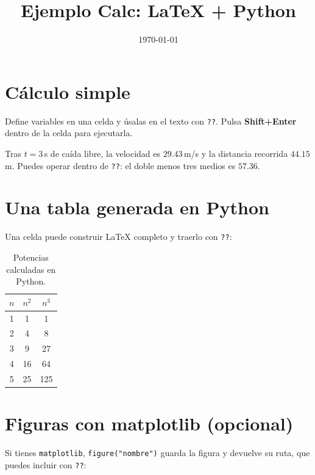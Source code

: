 \documentclass[12pt]{article}
\title{Ejemplo Calc: LaTeX + Python}
\author{}
\date{\today}
\begin{document}
\maketitle

\section{Cálculo simple}
Define variables en una celda y úsalas en el texto con \verb|??|.
Pulsa \textbf{Shift+Enter} dentro de la celda para ejecutarla.


Tras $t = 3\,$s de caída libre, la velocidad es $29.43\,$m/s y la
distancia recorrida $44.15\,$m. Puedes operar dentro de \verb|??|:
el doble menos tres medios es $57.36$.

\section{Una tabla generada en Python}
Una celda puede construir LaTeX completo y traerlo con \verb|??|:


\begin{table}[h]
  \centering
  \begin{tabular}{c c c}
    \toprule
    $n$ & $n^2$ & $n^3$ \\
    \midrule
    1 & 1 & 1 \\
2 & 4 & 8 \\
3 & 9 & 27 \\
4 & 16 & 64 \\
5 & 25 & 125 \\
    \bottomrule
  \end{tabular}
  \caption{Potencias calculadas en Python.}
\end{table}

\section{Figuras con matplotlib (opcional)}
Si tienes \texttt{matplotlib}, \verb|figure("nombre")| guarda la figura y
devuelve su ruta, que puedes incluir con \verb|??|:


\end{document}
